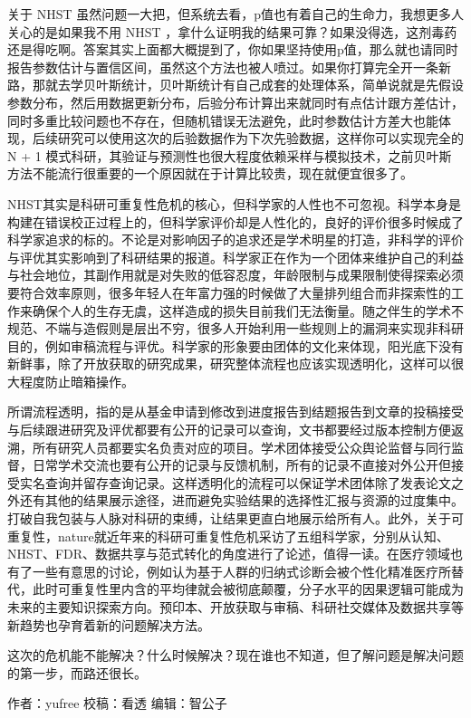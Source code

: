 \documentclass[
]{book}
\begin{document}
关于 NHST 虽然问题一大把，但系统去看，p值也有着自己的生命力，我想更多人关心的是如果我不用 NHST ，拿什么证明我的结果可靠？如果没得选，这剂毒药还是得吃啊。答案其实上面都大概提到了，你如果坚持使用p值，那么就也请同时报告参数估计与置信区间，虽然这个方法也被人喷过。如果你打算完全开一条新路，那就去学贝叶斯统计，贝叶斯统计有自己成套的处理体系，简单说就是先假设参数分布，然后用数据更新分布，后验分布计算出来就同时有点估计跟方差估计，同时多重比较问题也不存在，但随机错误无法避免，此时参数估计方差大也能体现，后续研究可以使用这次的后验数据作为下次先验数据，这样你可以实现完全的 N + 1 模式科研，其验证与预测性也很大程度依赖采样与模拟技术，之前贝叶斯方法不能流行很重要的一个原因就在于计算比较贵，现在就便宜很多了。

NHST其实是科研可重复性危机的核心，但科学家的人性也不可忽视。科学本身是构建在错误校正过程上的，但科学家评价却是人性化的，良好的评价很多时候成了科学家追求的标的。不论是对影响因子的追求还是学术明星的打造，非科学的评价与评优其实影响到了科研结果的报道。科学家正在作为一个团体来维护自己的利益与社会地位，其副作用就是对失败的低容忍度，年龄限制与成果限制使得探索必须要符合效率原则，很多年轻人在年富力强的时候做了大量排列组合而非探索性的工作来确保个人的生存无虞，这样造成的损失目前我们无法衡量。随之伴生的学术不规范、不端与造假则是层出不穷，很多人开始利用一些规则上的漏洞来实现非科研目的，例如审稿流程与评优。科学家的形象要由团体的文化来体现，阳光底下没有新鲜事，除了开放获取的研究成果，研究整体流程也应该实现透明化，这样可以很大程度防止暗箱操作。

所谓流程透明，指的是从基金申请到修改到进度报告到结题报告到文章的投稿接受与后续跟进研究及评优都要有公开的记录可以查询，文书都要经过版本控制方便返溯，所有研究人员都要实名负责对应的项目。学术团体接受公众舆论监督与同行监督，日常学术交流也要有公开的记录与反馈机制，所有的记录不直接对外公开但接受实名查询并留存查询记录。这样透明化的流程可以保证学术团体除了发表论文之外还有其他的结果展示途径，进而避免实验结果的选择性汇报与资源的过度集中。打破自我包装与人脉对科研的束缚，让结果更直白地展示给所有人。此外，关于可重复性，nature就近年来的科研可重复性危机采访了五组科学家，分别从认知、NHST、FDR、数据共享与范式转化的角度进行了论述，值得一读。在医疗领域也有了一些有意思的讨论，例如认为基于人群的归纳式诊断会被个性化精准医疗所替代，此时可重复性里内含的平均律就会被彻底颠覆，分子水平的因果逻辑可能成为未来的主要知识探索方向。预印本、开放获取与审稿、科研社交媒体及数据共享等新趋势也孕育着新的问题解决方法。

这次的危机能不能解决？什么时候解决？现在谁也不知道，但了解问题是解决问题的第一步，而路还很长。

作者：yufree
校稿：看透
编辑：智公子
\end{document}
